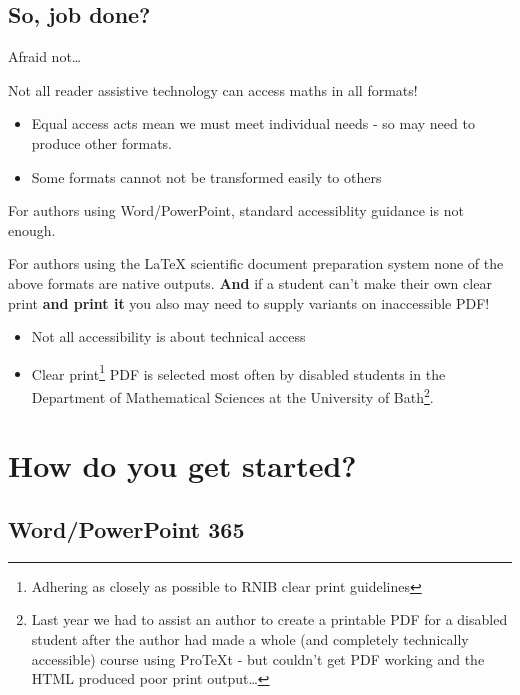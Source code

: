 \documentclass[
  12pt,
  a4-paperpaper,
  DIV=11,
  numbers=noendperiod]{scrartcl}
\providecommand{\tightlist}{%
  \setlength{\itemsep}{0pt}\setlength{\parskip}{0pt}}
\begin{document}
\subsection{So, job done?}\label{so-job-done}

Afraid not\ldots{}

Not all reader assistive technology can access maths in all formats!

\begin{itemize}
\tightlist
\item
  Equal access acts mean we must meet individual needs - so may need to
  produce other formats.
\item
  Some formats cannot not be transformed easily to others
\end{itemize}

For authors using Word/PowerPoint, standard accessiblity guidance is not
enough.

For authors using the LaTeX scientific document preparation system none
of the above formats are native outputs. \textbf{And} if a student can't
make their own clear print \textbf{and print it} you also may need to
supply variants on inaccessible PDF!

\begin{itemize}
\tightlist
\item
  Not all accessibility is about technical access
\item
  Clear print\footnote{Adhering as closely as possible to RNIB clear
    print guidelines} PDF is selected most often by disabled students in
  the Department of Mathematical Sciences at the University of
  Bath\footnote{Last year we had to assist an author to create a
    printable PDF for a disabled student after the author had made a
    whole (and completely technically accessible) course using ProTeXt -
    but couldn't get PDF working and the HTML produced poor print
    output\ldots{}}.
\end{itemize}

\section{How do you get started?}\label{how-do-you-get-started}

\subsection{Word/PowerPoint 365}\label{wordpowerpoint-365}
\end{document}

